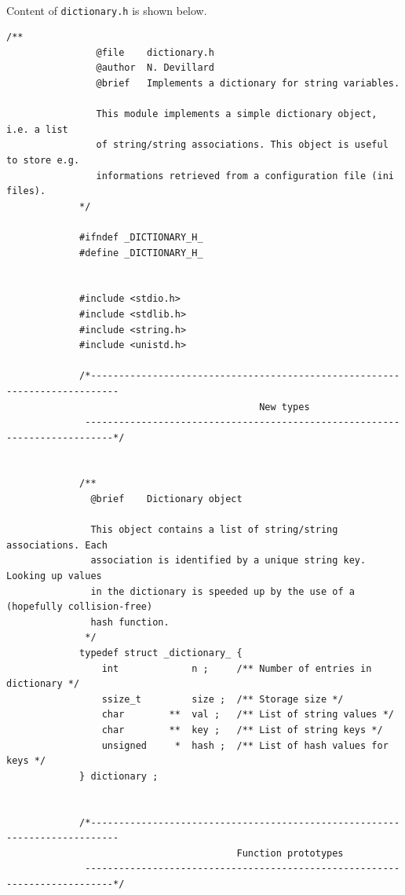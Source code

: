 \documentclass{article}
\begin{document}
            \paragraph{}
                Content of \texttt{dictionary.h} is shown below.
            \begin{Verbatim}[gobble=8]
                /**
                @file    dictionary.h
                @author  N. Devillard
                @brief   Implements a dictionary for string variables.
             
                This module implements a simple dictionary object, i.e. a list
                of string/string associations. This object is useful to store e.g.
                informations retrieved from a configuration file (ini files).
             */
             
             #ifndef _DICTIONARY_H_
             #define _DICTIONARY_H_
             
             
             #include <stdio.h>
             #include <stdlib.h>
             #include <string.h>
             #include <unistd.h>
             
             /*---------------------------------------------------------------------------
                                             New types
              ---------------------------------------------------------------------------*/
             
             
             /**
               @brief    Dictionary object
             
               This object contains a list of string/string associations. Each
               association is identified by a unique string key. Looking up values
               in the dictionary is speeded up by the use of a (hopefully collision-free)
               hash function.
              */
             typedef struct _dictionary_ {
                 int             n ;     /** Number of entries in dictionary */
                 ssize_t         size ;  /** Storage size */
                 char        **  val ;   /** List of string values */
                 char        **  key ;   /** List of string keys */
                 unsigned     *  hash ;  /** List of hash values for keys */
             } dictionary ;
             
             
             /*---------------------------------------------------------------------------
                                         Function prototypes
              ---------------------------------------------------------------------------*/
             

\end{Verbatim}
\end{document}
